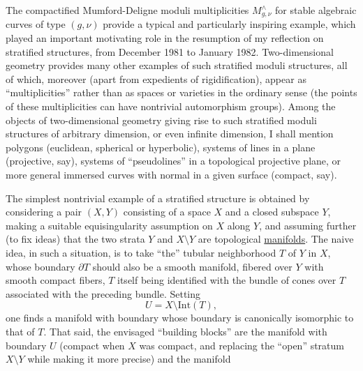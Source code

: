 
The compactified Mumford-Deligne moduli multiplicities $M^{\wedge}_{g,\nu}$
for stable algebraic curves of type $(g,\nu)$
provide a typical and particularly inspiring example, which
played an important motivating role in the resumption of my reflection
on stratified structures, from December 1981 to January
1982. Two-dimensional geometry provides many other
examples of such stratified moduli structures, all of which,
moreover (apart from expedients of rigidification), appear
as ``multiplicities'' rather than as spaces or varieties
in the ordinary sense (the points of these multiplicities can have
nontrivial automorphism groups). Among the objects of
two-dimensional geometry giving rise to such stratified moduli
structures of arbitrary dimension, or even infinite
dimension, I shall mention polygons (euclidean, spherical or
hyperbolic), systems of lines in a plane (projective,
say), systems of ``pseudolines'' in a topological projective
plane, or more general immersed curves with normal 
in a given surface (compact, say).

The simplest nontrivial example of a stratified
structure is obtained by considering a pair $(X,Y)$ consisting of a space
$X$ and a closed subspace $Y$, making a suitable equisingularity
assumption on $X$ along $Y$, and assuming
further (to fix ideas) that the two strata $Y$ and $X\setminus Y$ are
topological \uline{manifolds}. The naive idea, in such a situation,
is to take ``the'' tubular neighborhood $T$ of $Y$ in $X$, whose
boundary $\partial T$ should also be a smooth manifold, fibered over
$Y$ with smooth compact fibers, $T$ itself being identified with
the bundle of cones over $T$ associated with the preceding bundle. Setting
\[ U = X \setminus \mathrm{Int}(T), \]
one finds a manifold with boundary whose boundary is canonically
isomorphic to that of $T$. That said, the envisaged ``building blocks''
are the manifold with boundary $U$ (compact when $X$ was compact, and
replacing the ``open'' stratum $X\setminus Y$ while making it more precise) and the manifold


